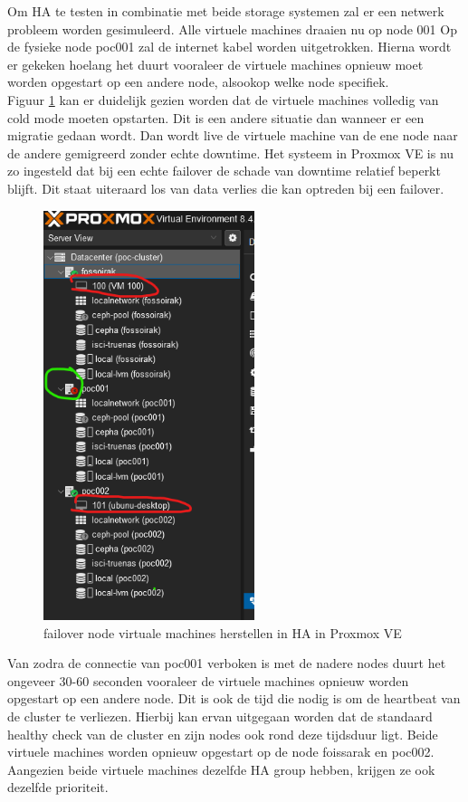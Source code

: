 Om HA te testen in combinatie met beide storage systemen zal er een netwerk probleem worden gesimuleerd.
Alle virtuele machines draaien nu op node 001
Op de fysieke node poc001 zal de internet kabel worden uitgetrokken. Hierna wordt er gekeken hoelang het duurt vooraleer de virtuele machines opnieuw moet worden opgestart op een andere node, alsookop welke node specifiek. \\

Figuur \ref{fig:failover-vm} kan er duidelijk gezien worden dat de virtuele machines volledig van cold mode moeten opstarten. Dit is een andere situatie dan wanneer er een migratie gedaan wordt.
Dan wordt live de virtuele machine van de ene node naar de andere gemigreerd zonder echte downtime.
Het systeem in Proxmox VE is nu zo ingesteld dat bij een echte failover de schade van downtime relatief beperkt blijft. Dit staat uiteraard los van data verlies die kan optreden bij een failover.
\begin{figure}[H]
  \centering
  \includegraphics[width=0.55\textwidth]{../poc/failover-prox.png}
  \caption{failover node virtuale machines herstellen in HA in Proxmox VE}
  \label{fig:failover-vm}
\end{figure}

Van zodra de connectie van poc001 verboken is met de nadere nodes duurt het ongeveer 30-60 seconden vooraleer de virtuele machines opnieuw worden opgestart op een andere node. Dit is ook de tijd die nodig is om de heartbeat van de cluster te verliezen.
Hierbij kan ervan uitgegaan worden dat de standaard healthy check van de cluster en zijn nodes ook rond deze tijdsduur ligt. Beide virtuele machines worden opnieuw opgestart op de node foissarak en poc002. \\
Aangezien beide virtuele machines dezelfde HA group hebben, krijgen ze ook dezelfde prioriteit.

